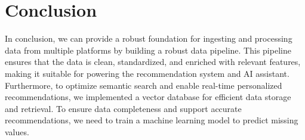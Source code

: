 \section*{Conclusion}
In conclusion, we can provide a robust foundation for ingesting and processing data from multiple platforms by building a robust data pipeline.
This pipeline ensures that the data is clean, standardized, and enriched
with relevant features, making it suitable for powering the recommendation system and AI assistant. Furthermore, to optimize semantic search
and enable real-time personalized recommendations, we implemented a vector database for efficient data storage and retrieval. To ensure data
completeness and support accurate recommendations, we need to train a machine learning model to predict missing values. 
